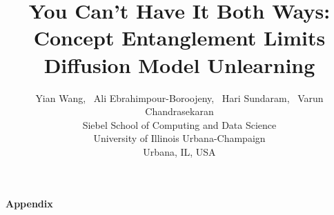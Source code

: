 \documentclass{article}
\title{You Can’t Have It Both Ways:
Concept Entanglement Limits Diffusion Model Unlearning}
\author{%
  Yian Wang,~
  Ali Ebrahimpour-Boroojeny,~
  Hari Sundaram,~ 
  Varun Chandrasekaran 
  \\[0.5em]
  Siebel School of Computing and Data Science \\
  University of Illinois Urbana-Champaign \\
  Urbana, IL, USA
}
\theoremstyle{plain}
\theoremstyle{definition}
\theoremstyle{remark}
\begin{document}
\maketitle











\newpage

\newpage
\appendix
{\large \begin{center} {\bf Appendix} \end{center}}














\newpage
\newpage

\end{document}
